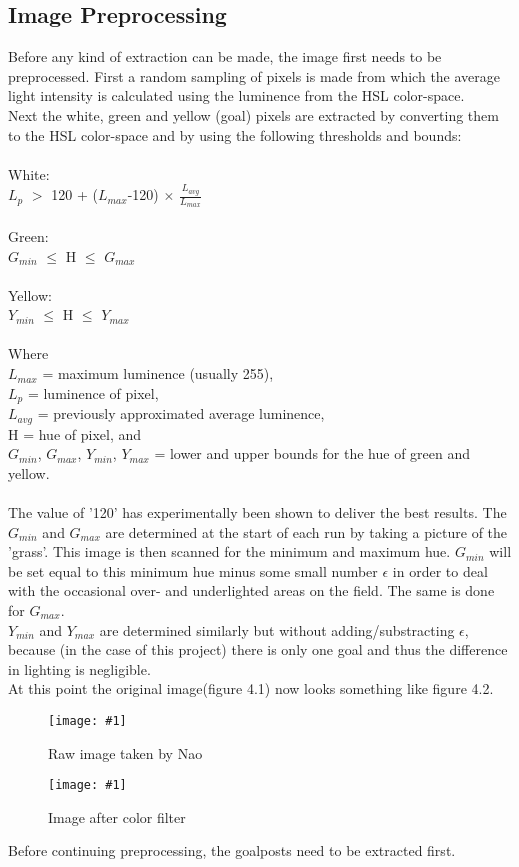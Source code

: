 \documentclass[twocolumn]{article}
\numberwithin{figure}{section}
\newcommand{\dkepic}[2]{ %
	\begin{figure}[H] %
	\texttt{[image: \#1]}
	\caption{#2}
	\label{#1}
	\end{figure}
}
\begin{document}
\subsection{Image Preprocessing}
Before any kind of extraction can be made, the image first needs to be preprocessed. First a random sampling of pixels is made from which the average light intensity is calculated using the luminence from the HSL color-space.\\
Next the white, green and yellow (goal) pixels are extracted by converting them to the HSL color-space and by using the following thresholds and bounds:\\ \\
White:\\ $L_{p}$ $>$ 120 + ($L_{max}$-120) $\times$ $\frac{L_{avg}}{L_{max}}$ \\ \\
Green:\\ $G_{min}$ $\leq$ H $\leq$ $G_{max}$\\ \\
Yellow:\\ $Y_{min}$ $\leq$ H $\leq$ $Y_{max}$\\ \\
Where \\
$L_{max}$ = maximum luminence (usually 255),\\
$L_{p}$ = luminence of pixel, \\
$L_{avg}$ = previously approximated average luminence, \\
H = hue of pixel, and \\
$G_{min}$, $G_{max}$, $Y_{min}$, $Y_{max}$ = lower and upper bounds for the hue of green and yellow.\\ \\
The value of '120' has experimentally been shown to deliver the best results. The $G_{min}$ and $G_{max}$ are determined at the start of each run by taking a picture of the 'grass'. This image is then scanned for the minimum and maximum hue. $G_{min}$ will be set equal to this minimum hue minus some small number $\epsilon$ in order to deal with the occasional over- and underlighted areas on the field. The same is done for $G_{max}$.\\
$Y_{min}$ and $Y_{max}$ are determined similarly but without adding/substracting $\epsilon$, because (in the case of this project) there is only one goal and thus the difference in lighting is negligible.\\
At this point the original image(figure 4.1) now looks something like figure 4.2.\\
\dkepic{figure_IP1}{Raw image taken by Nao}
\dkepic{figure_IP2}{Image after color filter}
Before continuing preprocessing, the goalposts need to be extracted first.
\end{document}
